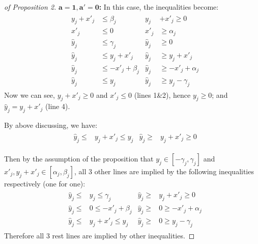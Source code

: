 \begin{proof}[of Proposition 2]
 
\textbf{$\mathbf{a = 1, a' = 0}$:} In this case, the inequalities become: \begin{align*}
	& \begin{aligned}
		y_j + x'_j &\leq \beta_j        &
		y_j &+ x'_j \geq 0 \\
		x'_j       &\leq 0       & 
		x'_j       &\geq \alpha_j \\
		\hat{y}_j  &\leq \gamma_j       &
		\hat{y}_j  &\geq 0 \\
		\hat{y}_j  &\leq y_j + x'_j &
		\hat{y}_j  &\geq y_j + x'_j  \\
		\hat{y}_j  &\leq -x'_j + \beta_j &
		\hat{y}_j  &\geq -x'_j + \alpha_j \\
		\hat{y}_j  &\leq y_j  &
		\hat{y}_j  &\geq y_j - \gamma_j
	\end{aligned}
\end{align*} Now we can see, $y_j+x'_j\geq 0$ and $x'_j \leq 0$ (lines 1\&2), hence $y_j \geq 0$; and $\hat{y}_j= y_j + x'_j$ (line 4). 

By above discussing,  we have: \begin{align*}
	& \begin{aligned}
		\hat{y}_j  \leq& y_j+x'_j \leq y_j  &\hat{y}_j  \geq& y_j+x'_j \geq 0
	\end{aligned}
\end{align*}

Then by the assumption of the proposition that $y_j \in [-\gamma_j, \gamma_j]$ and $x'_j,y_j+x'_j \in [\alpha_j,\beta_j]$, all 3 other lines are implied by the following inequalities respectively (one for one): \begin{align*}
	& \begin{aligned}
		\hat{y}_j  \leq&  y_j \leq \gamma_j       &
		\hat{y}_j  \geq& y_j+x'_j \geq 0 \\
		\hat{y}_j  \leq& 0 \leq -x'_j + \beta_j &
		\hat{y}_j  \geq& 0 \geq -x'_j + \alpha_j \\
		\hat{y}_j  \leq& y_j+x'_j \leq y_j  &
		\hat{y}_j  \geq& 0 \geq y_j - \gamma_j
	\end{aligned}
\end{align*}Therefore all 3 rest lines are implied by other inequalities.
	


\end{proof}
